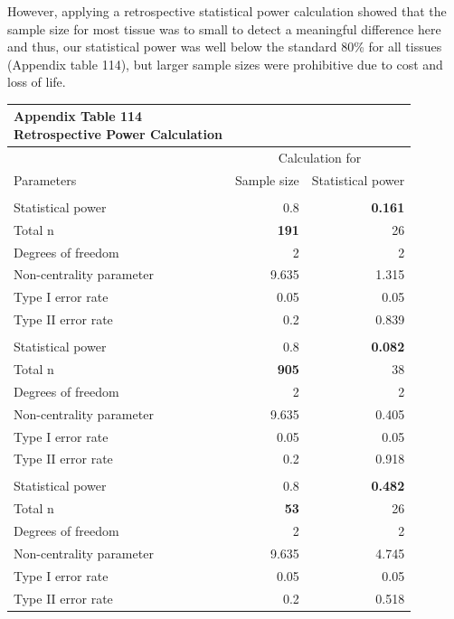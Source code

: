 \documentclass[
  12pt,
  letterpaper,
]{article}
\begin{document}
However, applying a retrospective statistical power calculation showed that the sample size for most tissue was to small to detect a meaningful difference here and thus, our statistical power was well below the standard 80\% for all tissues (Appendix table 114), but larger sample sizes were prohibitive due to cost and loss of life.

\begin{longtable}{l|rr}
\caption*{
{\large \textbf{Appendix Table 114}} \\ 
{\small \textbf{Retrospective Power Calculation}}
} \\ 
\toprule
\multicolumn{1}{l}{} & \multicolumn{2}{c}{Calculation for} \\ 
\cmidrule(lr){2-3}
\multicolumn{1}{l}{Parameters} & Sample size & Statistical power \\ 
\midrule\addlinespace[2.5pt]
\multicolumn{3}{l}{Brain} \\ 
\midrule\addlinespace[2.5pt]
Statistical power & 0.8 & \textbf{0.161} \\ 
Total n & \textbf{191} & 26 \\ 
Degrees of freedom & 2 & 2 \\ 
Non-centrality parameter & 9.635 & 1.315 \\ 
Type I error rate & 0.05 & 0.05 \\ 
Type II error rate & 0.2 & 0.839 \\ 
\midrule\addlinespace[2.5pt]
\multicolumn{3}{l}{Ear} \\ 
\midrule\addlinespace[2.5pt]
Statistical power & 0.8 & \textbf{0.082} \\ 
Total n & \textbf{905} & 38 \\ 
Degrees of freedom & 2 & 2 \\ 
Non-centrality parameter & 9.635 & 0.405 \\ 
Type I error rate & 0.05 & 0.05 \\ 
Type II error rate & 0.2 & 0.918 \\ 
\midrule\addlinespace[2.5pt]
\multicolumn{3}{l}{Eye} \\ 
\midrule\addlinespace[2.5pt]
Statistical power & 0.8 & \textbf{0.482} \\ 
Total n & \textbf{53} & 26 \\ 
Degrees of freedom & 2 & 2 \\ 
Non-centrality parameter & 9.635 & 4.745 \\ 
Type I error rate & 0.05 & 0.05 \\ 
Type II error rate & 0.2 & 0.518 \\ 

\end{longtable}
\end{document}
